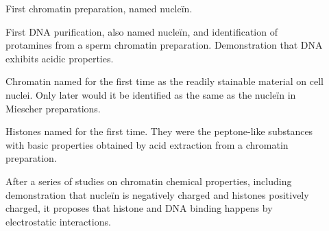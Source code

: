       \begin{description}
        \item[\cite{miescher1871-chromatin}]
        First chromatin preparation, named nucleïn.

        \item[\cite{miescher1874-protamines}]
        First DNA purification, also named nucleïn, and identification
        of protamines from a sperm chromatin preparation.  Demonstration
        that DNA exhibits acidic properties.

        \item[\cite{flemming1880-chromatin}]
        Chromatin named for the first time as the readily stainable
        material on cell nuclei. Only later would it be identified
        as the same as the nucleïn in Miescher preparations.

        \item[\cite{kossel1884-histones}]
        Histones named for the first time.  They were the peptone-like
        substances with basic properties obtained by acid extraction from
        a chromatin preparation.

        \item[\cite{huiskamp1903-electrostatic}]
        After a series of studies on chromatin chemical properties,
        including demonstration that nucleïn is negatively charged
        and histones positively charged, it proposes that
        histone and DNA binding happens by electrostatic interactions.


\end{description}
